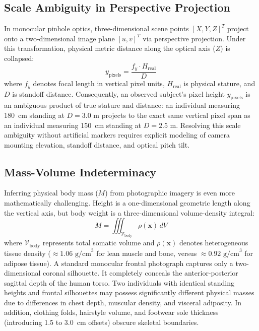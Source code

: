 \documentclass[12pt,a4paper,oneside]{report}
\begin{document}
\subsection{Scale Ambiguity in Perspective Projection}
In monocular pinhole optics, three-dimensional scene points $[X, Y, Z]^T$ project onto a two-dimensional image plane $[u, v]^T$ via perspective projection. Under this transformation, physical metric distance along the optical axis ($Z$) is collapsed:
\begin{equation}
y_{\text{pixels}} = \frac{f_y \cdot H_{\text{real}}}{D}
\end{equation}
where $f_y$ denotes focal length in vertical pixel units, $H_{\text{real}}$ is physical stature, and $D$ is standoff distance. Consequently, an observed subject's pixel height $y_{\text{pixels}}$ is an ambiguous product of true stature and distance: an individual measuring 180~cm standing at $D = 3.0\text{ m}$ projects to the exact same vertical pixel span as an individual measuring 150~cm standing at $D = 2.5\text{ m}$. Resolving this scale ambiguity without artificial markers requires explicit modeling of camera mounting elevation, standoff distance, and optical pitch tilt.

\subsection{Mass-Volume Indeterminacy}
Inferring physical body mass ($M$) from photographic imagery is even more mathematically challenging. Height is a one-dimensional geometric length along the vertical axis, but body weight is a three-dimensional volume-density integral:
\begin{equation}
M = \iiint_{\mathcal{V}_{\text{body}}} \rho(\mathbf{x})\, dV
\end{equation}
where $\mathcal{V}_{\text{body}}$ represents total somatic volume and $\rho(\mathbf{x})$ denotes heterogeneous tissue density ($\approx 1.06\text{ g/cm}^3$ for lean muscle and bone, versus $\approx 0.92\text{ g/cm}^3$ for adipose tissue). A standard monocular frontal photograph captures only a two-dimensional coronal silhouette. It completely conceals the anterior-posterior sagittal depth of the human torso. Two individuals with identical standing heights and frontal silhouettes may possess significantly different physical masses due to differences in chest depth, muscular density, and visceral adiposity. In addition, clothing folds, hairstyle volume, and footwear sole thickness (introducing 1.5 to 3.0~cm offsets) obscure skeletal boundaries.
\end{document}
